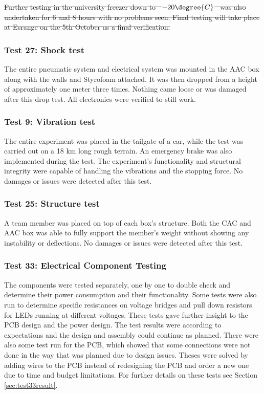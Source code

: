 \documentclass[a4paper,12pt,oneside]{article}
\providecommand{\DIFdeltex}[1]{{\protect\color{red}\sout{#1}}}                      %
\providecommand{\DIFdelbegin}{} %
\providecommand{\DIFdelend}{} %
\providecommand{\DIFdel}[1]{\texorpdfstring{\DIFdeltex{#1}}{}} %
\newcommand{\DIFscaledelfig}{0.5}
\newlength{\DIFdelgraphicswidth} %
\newlength{\DIFdelgraphicsheight} %
\newcommand{\DIFdelincludegraphics}[2][]{%
\sbox{\DIFdelgraphicsbox}{\DIFOincludegraphics[#1]{#2}}%
\settoboxwidth{\DIFdelgraphicswidth}{\DIFdelgraphicsbox} %
\settoboxtotalheight{\DIFdelgraphicsheight}{\DIFdelgraphicsbox} %
\scalebox{\DIFscaledelfig}{%
\parbox[b]{\DIFdelgraphicswidth}{\usebox{\DIFdelgraphicsbox}\\[-\baselineskip] \rule{\DIFdelgraphicswidth}{0em}}\llap{\resizebox{\DIFdelgraphicswidth}{\DIFdelgraphicsheight}{%
\setlength{\unitlength}{\DIFdelgraphicswidth}%
\begin{picture}(1,1)%
\thicklines\linethickness{2pt} %
{\color[rgb]{1,0,0}\put(0,0){\framebox(1,1){}}}%
{\color[rgb]{1,0,0}\put(0,0){\line( 1,1){1}}}%
{\color[rgb]{1,0,0}\put(0,1){\line(1,-1){1}}}%
\end{picture}%
}\hspace*{3pt}}} %
} %
\DeclareRobustCommand{\DIFdelbegin}{\DIFOdelbegin \let\includegraphics\DIFdelincludegraphics} %
\DeclareRobustCommand{\DIFdelend}{\DIFOaddend \let\includegraphics\DIFOincludegraphics} %
\begin{document}
\DIFdelbegin \DIFdel{Further testing in the university freezer down to \mbox{%
$-20\degree{C}$
}%
was also undertaken for 6 and 8 hours with no problems seen. Final testing will take place at Esrange on the 5th October as a final verification.
}%

\DIFdelend \subsubsection{Test 27: Shock test}
The entire pneumatic system and electrical system was mounted in the AAC box along with the walls and Styrofoam attached. It was then dropped from a height of approximately one meter three times. Nothing came loose or was damaged after this drop test. All electronics were verified to still work.

\subsubsection{Test 9: Vibration test}
The entire experiment was placed in the tailgate of a car, while the test was carried out on a 18 km long rough terrain. An emergency brake was also implemented during the test. The experiment's functionality and structural integrity were capable of handling the vibrations and the stopping force.
No damages or issues were detected after this test. 

\subsubsection{Test 25: Structure test}
A team member was placed on top of each box's structure. Both the CAC and AAC box was able to fully support the member's weight without showing any instability or deflections. No damages or issues were detected after this test. 

\subsubsection{Test 33: Electrical Component Testing}
\label{sec:Test33Test-Electronical-Component-Testing}
The components were tested separately, one by one to double check and determine their power consumption and their functionality. Some tests were also run to determine specific resistances on voltage bridges and pull down resistors for LEDs running at different voltages. These tests gave further insight to the PCB design and the power design. The test results were according to expectations and the design and assembly could continue as planned. There were also some test run for the PCB, which showed that some connections were not done in the way that was planned due to design issues. Theses were solved by adding wires to the PCB instead of redesigning the PCB and order a new one due to time and budget limitations. For further details on these tests see Section \ref{sec:test33result}.
\end{document}
